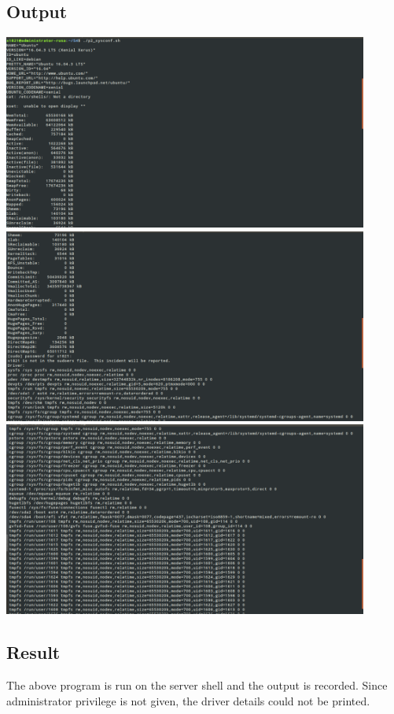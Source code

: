 \documentclass{article}
\begin{document}
\subsection{Output}
\includegraphics[width=0.9\textwidth]{img/p5/ss1.png}\newline
\includegraphics[width=0.9\textwidth]{img/p5/ss2.png}\newline
\includegraphics[width=0.9\textwidth]{img/p5/ss3.png}

\subsection{Result}
The above program is run on the server shell and the output is recorded. Since administrator privilege is not given, the driver details could not be printed. 
\end{document}
